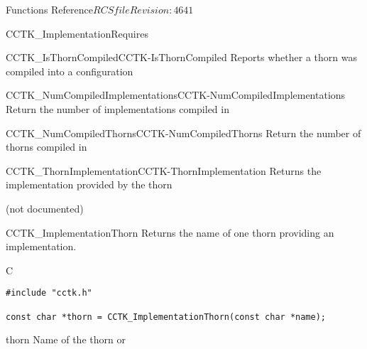 \begin{cactuspart}{ Functions Reference}{$RCSfile$}{$Revision: 4641 $}
\begin{FunctionDescription}{CCTK\_ImplementationRequires}
\begin{SeeAlsoSection}
\begin{SeeAlso2}{CCTK\_IsThornCompiled}{CCTK-IsThornCompiled}
  Reports whether a thorn was compiled into a configuration
\end{SeeAlso2}
\begin{SeeAlso2}{CCTK\_NumCompiledImplementations}{CCTK-NumCompiledImplementations}
  Return the number of implementations compiled in
\end{SeeAlso2}
\begin{SeeAlso2}{CCTK\_NumCompiledThorns}{CCTK-NumCompiledThorns}
  Return the number of thorns compiled in
\end{SeeAlso2}
\begin{SeeAlso2}{CCTK\_ThornImplementation}{CCTK-ThornImplementation}
  Returns the implementation provided by the thorn
\end{SeeAlso2}
\end{SeeAlsoSection}

\begin{ErrorSection}
\begin{Error}{}
(not documented)
\end{Error}
\end{ErrorSection}

\end{FunctionDescription}



\begin{FunctionDescription}{CCTK\_ImplementationThorn}
\label{CCTK-ImplementationThorn}
Returns the name of one thorn providing an implementation.

\begin{SynopsisSection}
\begin{Synopsis}{C}
\begin{verbatim}
#include "cctk.h"

const char *thorn = CCTK_ImplementationThorn(const char *name);
\end{verbatim}
\end{Synopsis}
\end{SynopsisSection}

\begin{ResultSection}
\begin{Result}{thorn}
Name of the thorn or 
\end{Result}
\end{ResultSection}


\end{FunctionDescription}
\end{cactuspart}
